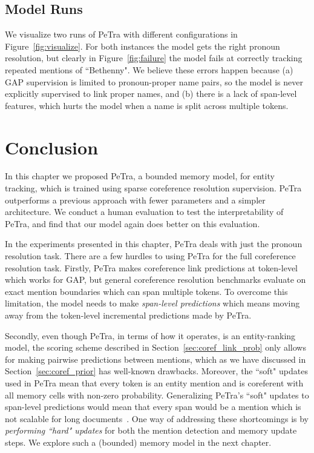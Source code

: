 \documentclass[12pt]{thesis-umich}[thesis]
\begin{document}
\subsection{Model Runs}
We visualize two runs of PeTra with different configurations in Figure~\ref{fig:visualize}. For both instances the model gets the right pronoun resolution, but clearly in Figure~\ref{fig:failure} the model fails at correctly tracking repeated mentions of ``Bethenny". We believe these errors happen because (a) GAP supervision is limited to pronoun-proper name pairs, so the model is never explicitly supervised to link proper names, and (b) there is a lack of span-level features, which hurts the model when a name is split across multiple tokens. 


\section{Conclusion}

In this chapter we proposed PeTra, a bounded memory model, for entity tracking, which is trained using sparse coreference resolution supervision.
PeTra outperforms a previous approach with fewer parameters and a simpler architecture.
We conduct a human evaluation to test the interpretability of PeTra, and find that
our model again does better on this evaluation.

In the experiments presented in this chapter, PeTra deals with just the pronoun resolution task. There are a few hurdles to using PeTra for the full coreference resolution task. 
Firstly, PeTra makes coreference link predictions at token-level which works for GAP, but general coreference resolution benchmarks evaluate on exact mention boundaries which can span multiple tokens. To overcome this limitation, the model needs to make \emph{span-level predictions
} which means moving away from the token-level incremental predictions made by PeTra. 

Secondly, even though PeTra, in terms of how it operates, is an entity-ranking model, the scoring scheme described in Section~\ref{sec:coref_link_prob} only allows for making pairwise predictions between mentions, which as we have discussed in Section~\ref{sec:coref_prior} has well-known drawbacks. 
Moreover, the ``soft" updates used in PeTra mean that every token is an entity mention and is coreferent with all memory cells with non-zero probability. Generalizing PeTra's ``soft" updates to span-level predictions would mean that every span would be a mention which is not scalable for long documents~\cite{lee-etal-2017-end}. One way of addressing these shortcomings is by \emph{performing ``hard" updates} for both the mention detection and memory update steps. We explore such a (bounded) memory model in the next chapter. 
\end{document}
